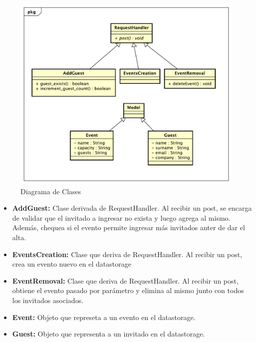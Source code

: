 \documentclass[a4paper,10pt]{article}
\begin{document}
        \begin{figure}[!Hhtb]                                             
            \centering                                                   
            \includegraphics[width=15cm,origin=c]{Imagenes/Clases.pdf}        
            \caption{Diagrama de Clases} \label{DiagClases}
        \end{figure}

        \begin{itemize}
            \item \textbf{AddGuest:} Clase derivada de RequestHandler. Al recibir un post, se encarga de validar
            que el invitado a ingresar no exista y luego agrega al mismo. Además, chequea si el evento permite
            ingresar más invitados anter de dar el alta.
            \item \textbf{EventsCreation:} Clase que deriva de RequestHandler. Al recibir un post, crea un evento
            nuevo en el datastorage
            \item \textbf{EventRemoval:} Clase que deriva de RequestHandler. Al recibir un post, obtiene el evento
            pasado por parámetro y elimina al mismo junto con todos los invitados asociados.
            \item \textbf{Event:} Objeto que represeta a un evento en el datastorage.
            \item \textbf{Guest:} Objeto que representa a un invitado en el datastorage.
        \end{itemize}
\end{document}
